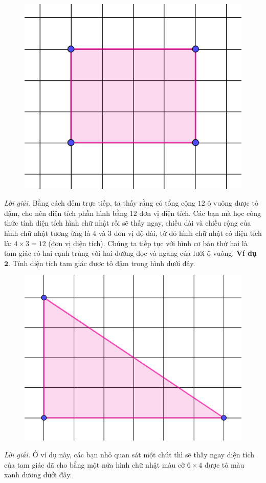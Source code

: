 \begin{multicols}{2}
\begin{figure}[H]
		\includegraphics[width=0.55\linewidth]{2}
		\vspace*{-10pt}
	\end{figure}
	\textit{Lời giải.} Bằng cách đếm trực tiếp, ta thấy rằng có tổng cộng $12$ ô vuông được tô đậm, cho nên diện tích phần hình bằng $12$ đơn vị diện tích.
	\vskip 0.1cm
	Các bạn mà học công thức tính diện tích hình chữ nhật rồi sẽ thấy ngay, chiều dài và chiều rộng của hình chữ nhật tương ứng là $4$ và $3$ đơn vị độ dài, từ đó hình chữ nhật có diện tích là: $4 \times 3 = 12$ (đơn vị diện tích).
	\vskip 0.1cm
	Chúng ta tiếp tục với hình cơ bản thứ hai là tam giác có hai cạnh trùng với hai đường dọc và ngang của lưới ô vuông.
	\vskip 0.1cm
	\textbf{\color{toancuabi}Ví dụ} $\pmb{2.}$ Tính diện tích tam giác được tô đậm trong hình dưới đây.
	\begin{figure}[H]
		\centering
		\vspace*{-5pt}
		\captionsetup{labelformat= empty, justification=centering}
		\includegraphics[width=0.55\linewidth]{3}
		\vspace*{-10pt}
	\end{figure}
	\textit{Lời giải.} Ở ví dụ này, các bạn nhỏ quan sát một chút thì sẽ thấy ngay diện tích của tam giác đã cho bằng một nửa hình chữ nhật màu cỡ $6\times4$ được tô màu xanh dương dưới đây.
	\begin{figure}[H]

\end{figure}
\end{multicols}
